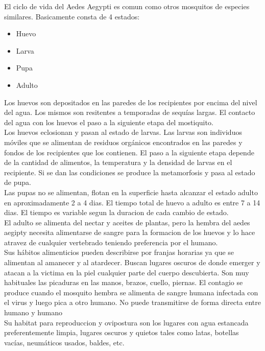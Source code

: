El ciclo de vida del Aedes Aegypti es comun como otros mosquitos de especies similares. Basicamente consta de 4 estados:\\
\begin{itemize}
\item Huevo
\item Larva
\item Pupa
\item Adulto\\
\end{itemize}

Los huevos son depositados en las paredes de los recipientes por encima del nivel del agua. Los mismos son resitentes a temporadas de sequías largas. El contacto del agua con los huevos el paso a la siguiente etapa del mostiquito.\\

Los huevos eclosionan y pasan al estado de larvas. Las larvas son individuos móviles que se alimentan de residuos orgánicos encontrados en las paredes y fondos de los recipientes que los contienen. El paso a la siguiente etapa depende de la cantidad de alimentos, la temperatura y la densidad de larvas en el recipiente. Si se dan las condiciones se produce la metamorfosis y pasa al estado de pupa.\\

Las pupas no se alimentan, flotan en la superficie hasta alcanzar el estado adulto en aproximadamente 2 a 4 dias. El tiempo total de huevo a adulto es entre 7 a 14 dias. El tiempo es variable segun la duracion de cada cambio de estado.\\

El adulto se alimenta del nectar y aceites de plantas, pero la hembra del aedes aegipty necesita alimentarse de sangre para la formacion de los huevos y lo hace atravez de cualquier vertebrado teniendo preferencia por el humano.\\

Sus hábitos alimenticios pueden describirse por franjas horarias ya que se alimentan al amanecer y al atardecer. Buscan lugares oscuros de donde emerger y atacan a la victima en la piel cualquier parte del cuerpo  descubierta. Son muy habituales las picaduras en las manos, brazos, cuello, piernas. El contagio se produce cuando el mosquito hembra se alimenta de sangre humana infectada con el virus y luego pica a otro humano. No puede transmitirse de forma directa entre humano y humano\\

Su habitat para reproduccion y ovipostura son los lugares con agua estancada preferentemente limpia, lugares oscuros y quietos tales como latas, botellas vacías, neumáticos usados, baldes, etc.\\

